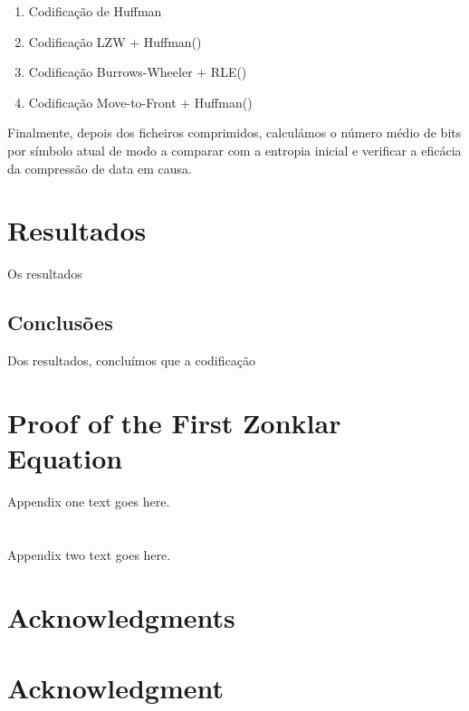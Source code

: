 \documentclass[10pt,journal,compsoc]{IEEEtran}
\begin{document}
    \begin{enumerate}
        \item Codificação de Huffman
        \item Codificação LZW + Huffman()
        \item Codificação Burrows-Wheeler + RLE()
        \item Codificação Move-to-Front + Huffman()
    \end{enumerate}
    
    
    Finalmente, depois dos ficheiros comprimidos, calculámos o número médio de bits por símbolo atual de modo a comparar com a entropia inicial e verificar a eficácia da compressão de data em causa.
    
    \section{Resultados} %
    Os resultados 
    
    
    
    \subsection{Conclusões}
    Dos resultados, concluímos que a codificação
    
    
    
    \appendices
    \section{Proof of the First Zonklar Equation}
    Appendix one text goes here.
    
    \section{}
    Appendix two text goes here.
    
    
    \ifCLASSOPTIONcompsoc
      \section*{Acknowledgments}
    \else
      \section*{Acknowledgment}
    \fi
    
\end{document}
